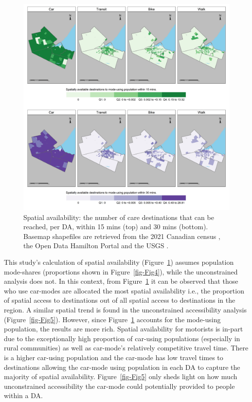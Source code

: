\documentclass[
  authoryear,
  preprint,
  3p]{elsarticle}
\begin{document}
\begin{figure}

{\centering \includegraphics[width=6.25in,height=\textheight]{figures/Fig6-plot_Savail_measures.png}

}

\caption{\label{fig-Fig6}Spatial availability: the number of care
destinations that can be reached, per DA, within 15 mins (top) and 30
mins (bottom). Basemap shapefiles are retrieved from the 2021 Canadian
census \citep{governmentofcanadaCensusPopulation2023}, the Open Data
Hamilton Portal \citep{opendatahamiltonCityBoundary2023} and the USGS
\citep{greatlakesUSGS2010}.}

\end{figure}

This study's calculation of spatial availability (Figure~\ref{fig-Fig6})
assumes population mode-shares (proportions shown in
Figure~\ref{fig-Fig4}), while the unconstrained analysis does not. In
this context, from Figure~\ref{fig-Fig6} it can be observed that those
who use car-modes are allocated the most spatial availability i.e., the
proportion of spatial access to destinations out of all spatial access
to destinations in the region. A similar spatial trend is found in the
unconstrained accessibility analysis (Figure~\ref{fig-Fig5}). However,
since Figure~\ref{fig-Fig6} accounts for the mode-using population, the
results are more rich. Spatial availability for motorists is in-part due
to the exceptionally high proportion of car-using populations
(especially in rural communities) as well as car-mode's relatively
competitive travel time. There is a higher car-using population and the
car-mode has low travel times to destinations allowing the car-mode
using population in each DA to capture the majority of spatial
availability. Figure~\ref{fig-Fig5} only sheds light on how much
unconstrained accessibility the car-mode could potentially provided to
people within a DA.
\end{document}
